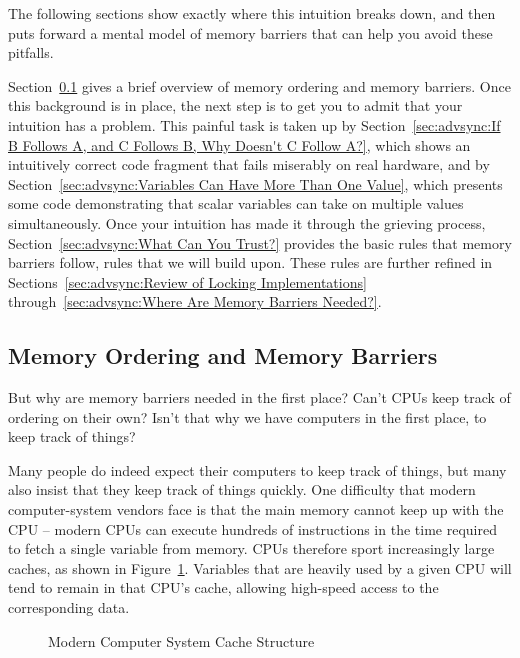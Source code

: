 The following sections show exactly where this intuition breaks down,
and then puts forward a mental model of memory barriers that can help
you avoid these pitfalls.

Section~\ref{sec:advsync:Memory Ordering and Memory Barriers}
gives a brief overview of memory ordering and memory barriers.
Once this background is in place, the next step is to get you to admit
that your intuition has a problem.
This painful task is taken up by
Section~\ref{sec:advsync:If B Follows A, and C Follows B, Why Doesn't C Follow A?},
which shows an intuitively correct code fragment that fails miserably
on real hardware, and by
Section~\ref{sec:advsync:Variables Can Have More Than One Value},
which presents some code demonstrating that scalar variables can
take on multiple values simultaneously.
Once your intuition has made it through the grieving process,
Section~\ref{sec:advsync:What Can You Trust?}
provides the basic rules that memory barriers follow, rules that we
will build upon.
These rules are further refined in
Sections~\ref{sec:advsync:Review of Locking Implementations}
through~\ref{sec:advsync:Where Are Memory Barriers Needed?}.

\subsection{Memory Ordering and Memory Barriers}
\label{sec:advsync:Memory Ordering and Memory Barriers}

But why are memory barriers needed in the first place?
Can't CPUs keep track of ordering on their own?
Isn't that why we have computers in the first place, to keep track of things?

Many people do indeed expect their computers to keep track of things,
but many also insist that they keep track of things quickly.
One difficulty that modern computer-system vendors face is that
the main memory cannot keep up with the CPU -- modern CPUs can execute
hundreds of instructions in the time required to fetch a single variable
from memory.
CPUs therefore sport increasingly large caches, as shown in
Figure~\ref{fig:advsync:Modern Computer System Cache Structure}.
Variables that are heavily used by a given CPU will tend to remain
in that CPU's cache, allowing high-speed access to the corresponding
data.

\begin{figure}[htb]
\begin{center}
\end{center}
\caption{Modern Computer System Cache Structure}
\label{fig:advsync:Modern Computer System Cache Structure}
\end{figure}

